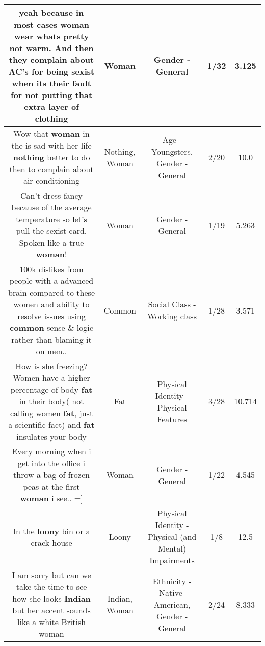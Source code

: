 \documentclass[11pt]{article}
\newlength\mylength
\begin{document}
\begin{center}
\begin{longtable}{|C{.65\mylength}|C{.30\mylength}|C{.12\mylength}|C{.12\mylength}|C{.12\mylength}|}
  \small yeah because in most cases \textbf{woman} wear whats pretty not warm. And then they complain about AC's for being sexist when its their fault for not putting that extra layer of clothing\normalsize   & Woman & Gender - General & 1/32 & 3.125 \\  \hline
  \small Wow that \textbf{woman} in the is sad with her life \textbf{nothing} better to do then to complain about air conditioning\normalsize   & Nothing, Woman & Age - Youngsters, Gender - General & 2/20 & 10.0 \\  \hline
  \small Can't dress fancy because of the average temperature so let's pull the sexist card. Spoken like a true \textbf{woman}!\normalsize   & Woman & Gender - General & 1/19 & 5.263 \\  \hline
  \small 100k dislikes from people with a advanced brain compared to these women and ability to resolve issues using \textbf{common} sense \& logic rather than blaming it on men..\normalsize   & Common & Social Class - Working class & 1/28 & 3.571 \\  \hline
  \small How is she freezing? Women have a higher percentage of body \textbf{fat} in their body( not calling women \textbf{fat}, just a scientific fact) and \textbf{fat} insulates your body\normalsize   & Fat & Physical Identity - Physical Features & 3/28 & 10.714 \\  \hline
  \small Every morning when i get into the office i throw a bag of frozen peas at the first \textbf{woman}  i see.. =]\normalsize   & Woman & Gender - General & 1/22 & 4.545 \\  \hline
  \small In the \textbf{loony} bin or a crack house\normalsize   & Loony & Physical Identity - Physical (and Mental) Impairments & 1/8 & 12.5 \\  \hline
  \small I am sorry but can we take the time to see how she looks \textbf{Indian} but her accent sounds like a white British woman\normalsize   & Indian, Woman & Ethnicity - Native-American, Gender - General & 2/24 & 8.333 \\  \hline

\end{longtable}
\end{center}
\end{document}

